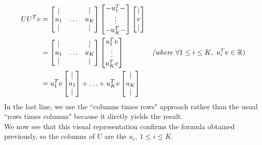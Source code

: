 \documentclass[12pt]{article}
\begin{document}
\begin{align*}
    UU^T v
     & =
    \begin{bmatrix}
        |   &        & |   \\
        u_1 & \ldots & u_K \\
        |   &        & |
    \end{bmatrix}
    \begin{bmatrix}
        - u_1^T   - \\
        \vdots      \\
        - u_K^T   - \\
    \end{bmatrix}
    \begin{bmatrix}
        | \\
        v \\
        | \\
    \end{bmatrix}                                     \\
     & =
    \begin{bmatrix}
        |   &        & |   \\
        u_1 & \ldots & u_K \\
        |   &        & |
    \end{bmatrix}
    \begin{bmatrix}
        u_1^T v \\
        \vdots  \\
        u_K^T v \\
    \end{bmatrix}
     & \textit{(where } \forall 1 \leq i \leq K, \ u^T_i v \in \mathbb{R}) \\
     & =
    u_1^T v
    \begin{bmatrix}
        |   \\
        u_1 \\
        |
    \end{bmatrix}
    + \ldots +
    u_K^T v
    \begin{bmatrix}
        |   \\
        u_K \\
        |
    \end{bmatrix}
\end{align*}
In the last line, we use the ``columns times rows" approach rather than the usual ``rows times columns" because it diretly yields the result. \\
We now see that this visual representation confirms the formula obtained previously, so the columns of \(U\) are the \(u_i, \ 1 \leq i \leq K\).
\end{document}
